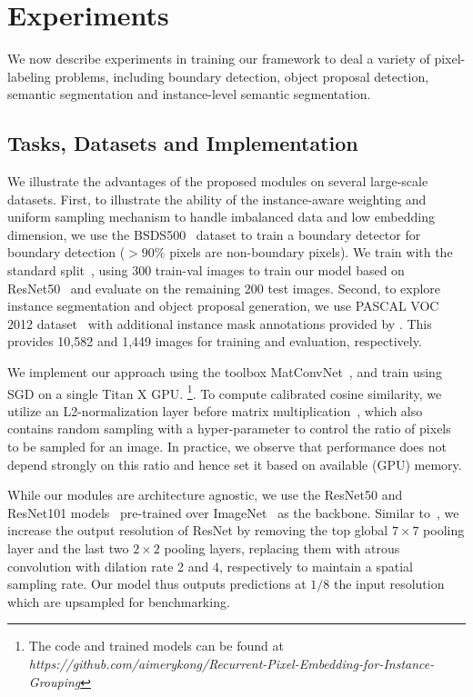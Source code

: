 \section{Experiments}

We now describe experiments in training our framework to deal a
variety of pixel-labeling problems, including boundary detection, object
proposal detection, semantic segmentation and instance-level semantic
segmentation.

\subsection{Tasks, Datasets and Implementation}

We illustrate the advantages of the proposed modules on several large-scale
datasets.  First, to illustrate the ability of the instance-aware weighting and
uniform sampling mechanism to handle imbalanced data and low embedding
dimension, we use the BSDS500~\cite{arbelaez2011contour} dataset to train a
boundary detector for boundary detection ($>90\%$ pixels are
non-boundary pixels).  We train with the standard
split~\cite{arbelaez2011contour,xie2015holistically},
using 300 train-val images to train our model based on
ResNet50~\cite{he2016deep} and evaluate on the remaining 200 test images.
Second, to explore instance segmentation and object proposal generation, we use
PASCAL VOC 2012 dataset~\cite{everingham2010pascal} with additional instance
mask annotations provided by \cite{hariharan2011semantic}. This provides 10,582
and 1,449 images for training and evaluation, respectively.

We implement our approach using the toolbox
MatConvNet~\cite{vedaldi2015matconvnet}, and train using SGD on a single Titan
X GPU.
\footnote{The code and trained models can be found at
{\color{blue} \emph{
{https://github.com/aimerykong/Recurrent-Pixel-Embedding-for-Instance-Grouping}}}}.
To compute calibrated cosine similarity, we utilize an L2-normalization
layer before matrix multiplication~\cite{kong2016low}, which also contains
random sampling with a hyper-parameter to control the ratio of pixels to be
sampled for an image.  In practice, we observe that performance does not depend
strongly on this ratio and hence set it based on available (GPU) memory.

While our modules are architecture agnostic, we use the
ResNet50 and ResNet101 models~\cite{he2016deep} pre-trained over
ImageNet~\cite{deng2009imagenet} as the backbone.
Similar to~\cite{chen2016deeplab}, we increase the output resolution of ResNet
by removing the top global $7\times 7$ pooling layer and the last two $2\times2$
pooling layers, replacing them with atrous convolution with dilation rate 2 and
4, respectively to maintain a spatial sampling rate. Our model thus outputs
predictions at $1/8$ the input resolution which are upsampled for benchmarking.

